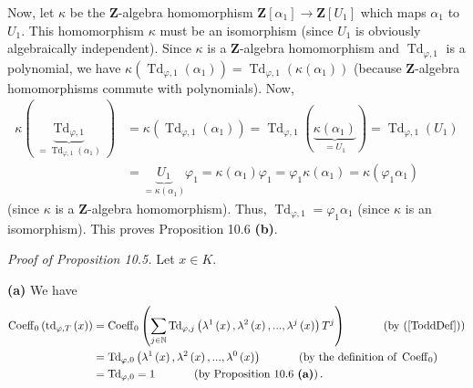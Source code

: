 \documentclass[numbers=enddot,12pt,final,onecolumn,notitlepage]{scrartcl}%
\begin{document}
Now, let $\kappa$ be the $\mathbf{Z}$-algebra homomorphism $\mathbf{Z}\left[
\alpha_{1}\right]  \rightarrow\mathbf{Z}\left[  U_{1}\right]  $ which maps
$\alpha_{1}$ to $U_{1}$. This homomorphism $\kappa$ must be an isomorphism
(since $U_{1}$ is obviously algebraically independent). Since $\kappa$ is a
$\mathbf{Z}$-algebra homomorphism and $\operatorname*{Td}\nolimits_{\varphi
,1}$ is a polynomial, we have $\kappa\left(  \operatorname*{Td}%
\nolimits_{\varphi,1}\left(  \alpha_{1}\right)  \right)  =\operatorname*{Td}%
\nolimits_{\varphi,1}\left(  \kappa\left(  \alpha_{1}\right)  \right)  $
(because $\mathbf{Z}$-algebra homomorphisms commute with polynomials). Now,%
\begin{align*}
\kappa\left(  \underbrace{\operatorname*{Td}\nolimits_{\varphi,1}%
}_{=\operatorname*{Td}\nolimits_{\varphi,1}\left(  \alpha_{1}\right)
}\right)   &  =\kappa\left(  \operatorname*{Td}\nolimits_{\varphi,1}\left(
\alpha_{1}\right)  \right)  =\operatorname*{Td}\nolimits_{\varphi,1}\left(
\underbrace{\kappa\left(  \alpha_{1}\right)  }_{=U_{1}}\right)
=\operatorname*{Td}\nolimits_{\varphi,1}\left(  U_{1}\right) \\
&  =\underbrace{U_{1}}_{=\kappa\left(  \alpha_{1}\right)  }\varphi_{1}%
=\kappa\left(  \alpha_{1}\right)  \varphi_{1}=\varphi_{1}\kappa\left(
\alpha_{1}\right)  =\kappa\left(  \varphi_{1}\alpha_{1}\right)
\end{align*}
(since $\kappa$ is a $\mathbf{Z}$-algebra homomorphism). Thus,
$\operatorname*{Td}\nolimits_{\varphi,1}=\varphi_{1}\alpha_{1}$ (since
$\kappa$ is an isomorphism). This proves Proposition 10.6 \textbf{(b)}.

\textit{Proof of Proposition 10.5.} Let $x\in K$.

\textbf{(a)} We have%
\begin{align*}
\operatorname*{Coeff}\nolimits_{0}\left(  \operatorname*{td}\nolimits_{\varphi
,T}\left(  x\right)  \right)   &  =\operatorname*{Coeff}\nolimits_{0}\left(
\sum_{j\in\mathbb{N}}\operatorname*{Td}\nolimits_{\varphi,j}\left(
\lambda^{1}\left(  x\right)  ,\lambda^{2}\left(  x\right)  ,...,\lambda
^{j}\left(  x\right)  \right)  T^{j}\right)  \ \ \ \ \ \ \ \ \ \ \left(
\text{by (\ref{ToddDef})}\right) \\
&  =\operatorname*{Td}\nolimits_{\varphi,0}\left(  \lambda^{1}\left(
x\right)  ,\lambda^{2}\left(  x\right)  ,...,\lambda^{0}\left(  x\right)
\right)  \ \ \ \ \ \ \ \ \ \ \left(  \text{by the definition of }%
\operatorname*{Coeff}\nolimits_{0}\right) \\
&  =\operatorname*{Td}\nolimits_{\varphi,0}=1\ \ \ \ \ \ \ \ \ \ \left(
\text{by Proposition 10.6 \textbf{(a)}}\right)  .
\end{align*}
\end{document}
